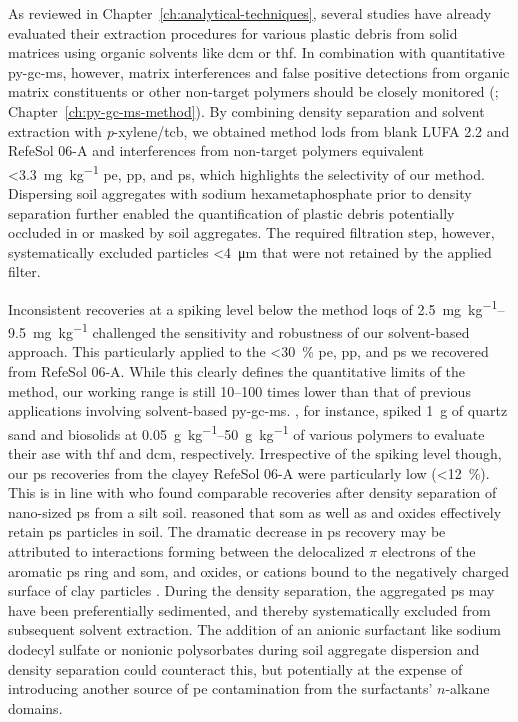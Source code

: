 As reviewed in Chapter~\ref{ch:analytical-techniques}, several studies have already evaluated their extraction procedures for various plastic debris from solid matrices using organic solvents like \ac{dcm} or \ac{thf}. In combination with quantitative \ac{py-gc-ms}, however, matrix interferences and false positive detections from organic matrix constituents or other non-target polymers should be closely monitored (\citealp{DierkesQuantification2019}; Chapter~\ref{ch:py-gc-ms-method}).
By combining density separation and solvent extraction with \textit{p}-xylene/\ac{tcb}, we obtained method \acp{lod} from blank LUFA 2.2 and RefeSol 06-A and interferences from non-target polymers equivalent \SI{<3.3}{\milli\gram\per\kilo\gram} \ac{pe}, \ac{pp}, and \ac{ps}, which highlights the selectivity of our method. Dispersing soil aggregates with sodium hexametaphosphate prior to density separation further enabled the quantification of plastic debris potentially occluded in or masked by soil aggregates. The required filtration step, however, systematically excluded particles \SI{<4}{\micro\meter} that were not retained by the applied filter.

Inconsistent recoveries at a spiking level below the method \acp{loq} of \SIrange[range-phrase={ to }]{2.5}{9.5}{\milli\gram\per\kilo\gram} challenged the sensitivity and robustness of our solvent-based approach. This particularly applied to the \SI{<30}{\percent} \ac{pe}, \ac{pp}, and \ac{ps} we recovered from RefeSol 06-A. While this clearly defines the quantitative limits of the method, our working range is still \numrange{10}{100} times lower than that of previous applications involving solvent-based \ac{py-gc-ms}. , for instance, spiked \SI{1}{\gram} of quartz sand and biosolids at \SIrange{0.05}{50}{\gram\per\kilo\gram} of various polymers to evaluate their \ac{ase} with \ac{thf} and \ac{dcm}, respectively.
Irrespective of the spiking level though, our \ac{ps} recoveries from the clayey RefeSol 06-A were particularly low (\SI{<12}{\percent}). This is in line with \citet{WangPoor2018} who found comparable recoveries after density separation of nano-sized \ac{ps} from a silt soil. \citet{LuoDistribution2020,WuTransport2020} reasoned that \ac{som} as well as  and  oxides effectively retain \ac{ps} particles in soil. The dramatic decrease in \ac{ps} recovery may be attributed to interactions forming between the delocalized $\pi$ electrons of the aromatic \ac{ps} ring and \ac{som},  and  oxides, or cations bound to the negatively charged surface of clay particles \citep{NewcombDeveloping2017}. During the density separation, the aggregated \ac{ps} may have been preferentially sedimented, and thereby systematically excluded from subsequent solvent extraction. The addition of an anionic surfactant like sodium dodecyl sulfate or nonionic polysorbates during soil aggregate dispersion and density separation could counteract this, but potentially at the expense of introducing another source of \ac{pe} contamination from the surfactants' $n$-alkane domains.

